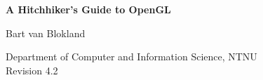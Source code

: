 \documentclass[12pt,a4paper,oneside]{report}
\begin{document}

\thispagestyle{empty}

\begin{center}
    {\Huge\textbf{A Hitchhiker's Guide to OpenGL}} \\  

    \vspace{1cm}

    {\large Bart van Blokland}\\

    \vspace{18cm}

	{\large Department of Computer and Information Science, NTNU}\\
	\vspace{1cm}
    {\large Revision 4.2}\\ 
\end{center}

\newpage

\setcounter{tocdepth}{1}
\tableofcontents
\clearpage






\newpage

\begin{center}
	\vspace{9cm}
\end{center}
\end{document}
